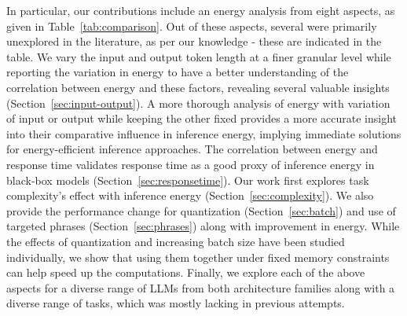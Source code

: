 In particular, our contributions include an energy analysis from eight aspects, as given in Table~\ref{tab:comparison}. Out of these aspects, several were primarily unexplored in the literature, as per our knowledge - these are indicated in the table. %
We vary the input and output token length at a finer granular level while reporting the variation in energy to have a better understanding of the correlation between energy and these factors, revealing several valuable insights (Section~\ref{sec:input-output}). A more thorough analysis of energy with variation of input or output while keeping the other fixed provides a more accurate insight into their comparative influence in inference energy, implying immediate solutions for energy-efficient inference approaches. The correlation between energy and response time validates response time as a good proxy of inference energy in black-box models (Section~\ref{sec:responsetime}). Our work first explores task complexity's effect with inference energy (Section~\ref{sec:complexity}). We also provide the performance change for quantization (Section~\ref{sec:batch}) and use of targeted phrases (Section~\ref{sec:phrases}) along with improvement in energy. While the effects of quantization and increasing batch size have been studied individually, we show that using them together under fixed memory constraints can help speed up the computations. Finally, we explore each of the above aspects for a diverse range of LLMs from both architecture families along with a diverse range of tasks, which was mostly lacking in previous attempts. 